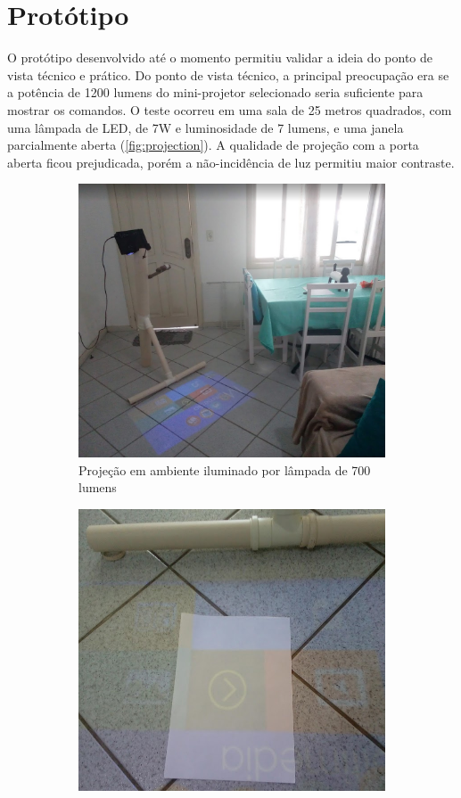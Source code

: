 \section{Protótipo}
\label{s_prototipo}
O protótipo desenvolvido até o momento permitiu validar a ideia do ponto de vista técnico e prático. Do ponto de vista técnico, a principal preocupação era se a potência de 1200 lumens do mini-projetor selecionado seria suficiente para mostrar os comandos. O teste ocorreu em uma sala de 25 metros quadrados, com uma lâmpada de LED, de 7W e luminosidade de 7 lumens, e uma janela parcialmente aberta (\autoref{fig:projection}). A qualidade de projeção com a porta aberta ficou prejudicada, porém a não-incidência de luz permitiu maior contraste.
\begin{figure}[b]
    \centering
    \begin{subfigure}{.33\textwidth}
        \centering
        \includegraphics[width=.9\linewidth,fbox]{figs/projection.png}
        \caption{Projeção em ambiente iluminado por lâmpada de 700 lumens}
        \label{fig:projection}
    \end{subfigure}%
    \begin{subfigure}{.33\textwidth}
        \centering
        \includegraphics[width=.9\linewidth,fbox]{figs/projection_day.png}

\end{subfigure}
\end{figure}
